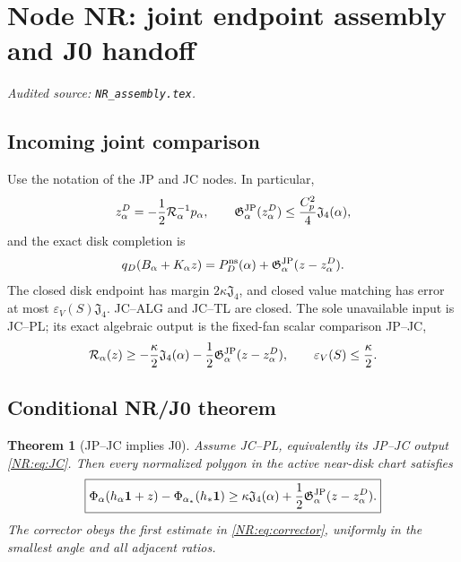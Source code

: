 \documentclass[11pt]{amsart}
\providecommand{\mathscr}{\mathcal}
\numberwithin{equation}{section}
\newtheorem{theorem}{Theorem}[section]
\theoremstyle{definition}
\theoremstyle{remark}
\newcommand{\Jfour}{\mathfrak J_4}
\newcommand{\Gjp}{\mathfrak G^{\rm JP}}
\providecommand{\mathscr}[1]{\mathcal{#1}}
\begin{document}
\begingroup
\section{Node NR: joint endpoint assembly and J0 handoff}
\label{module:NR}
\noindent\textit{Audited source: \nolinkurl{NR_assembly.tex}.}
\subsection{Incoming joint comparison}

Use the notation of the JP and JC nodes.  In particular,
\begin{equation}\label{NR:eq:corrector}
 z_\alpha^D=-\frac12\mathcal R_\alpha^{-1}p_\alpha,
 \qquad
 \Gjp_\alpha(z_\alpha^D)
 \le\frac{C_p^2}{4}\Jfour(\alpha),
\end{equation}
and the exact disk completion is
\begin{equation}\label{NR:eq:disk-completion}
 q_D(B_\alpha+K_\alpha z)
 =P_D^{\rm ns}(\alpha)+\Gjp_\alpha(z-z_\alpha^D).
\end{equation}
The closed disk endpoint has margin $2\kappa\Jfour$, and closed value
matching has error at most $\varepsilon_V(S)\Jfour$.  JC--ALG and JC--TL
are closed.  The sole unavailable input is JC--PL; its exact algebraic
output is the fixed-fan scalar comparison JP--JC,
\begin{equation}\label{NR:eq:JC}
 \mathscr R_\alpha(z)
 \ge-\frac\kappa2\Jfour(\alpha)
      -\frac12\Gjp_\alpha(z-z_\alpha^D),
 \qquad \varepsilon_V(S)\le\frac\kappa2.
\end{equation}

\subsection{Conditional NR/J0 theorem}

\begin{theorem}[JP--JC implies J0]\label{NR:thm:NR}
Assume JC--PL, equivalently its JP--JC output \eqref{NR:eq:JC}.  Then every normalized polygon in
the active near-disk chart satisfies
\begin{equation}\label{NR:eq:J0}
\boxed{
 \Phi_\alpha(h_\alpha\mathbf1+z)
 -\Phi_{\alpha_*}(h_*\mathbf1)
 \ge\kappa\Jfour(\alpha)
      +\frac12\Gjp_\alpha(z-z_\alpha^D).}
\end{equation}
The corrector obeys the first estimate in \eqref{NR:eq:corrector}, uniformly
in the smallest angle and all adjacent ratios.
\end{theorem}
\end{document}

